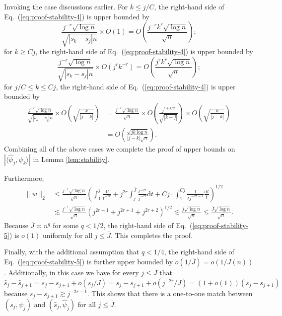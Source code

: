 \documentclass[11pt,a4paper]{article}
\renewcommand{\hat}{\widehat}
\renewcommand{\bar}{\overline}
\theoremstyle{definition}
\theoremstyle{plain}
\theoremstyle{remark}
\newcommand{\ud}{\mathrm d}
\begin{document}
Invoking the case discussions earlier. For $k\leq j/C$, the right-hand side of Eq.~(\ref{eq:proof-stability-4}) is upper bounded by
$$
 \frac{j^{-r}\sqrt{\log n}}{\sqrt{|s_k-s_j|n}}\times O(1) = O\left(\frac{j^{-r}k^r\sqrt{\log n}}{\sqrt{n}}\right);
$$
for $k\geq Cj$, the right-hand side of Eq.~(\ref{eq:proof-stability-4}) is upper bounded by 
$$
\frac{j^{-r}\sqrt{\log n}}{\sqrt{|s_k-s_j|n}}\times O(j^rk^{-r}) = O\left(\frac{j^rk^r\sqrt{\log n}}{\sqrt{n}}\right);
$$
for $j/C\leq k\leq Cj$, the right-hand side of Eq.~(\ref{eq:proof-stability-4}) is upper bounded by
\begin{align*}
\frac{j^{-r}\sqrt{\log n}}{\sqrt{|s_k-s_j|n}}\times O\left(\sqrt{\frac{k}{|j-k|}}\right) &= \frac{j^{-r}\sqrt{\log n}}{\sqrt{n}}\times O\left(\frac{j^{r+1/2}}{\sqrt{|k-j|}}\right)\times O\left(\sqrt{\frac{k}{|j-k|}}\right)\\
&= O\left(\frac{\sqrt{jk\log n}}{|j-k|\sqrt{n}}\right).
\end{align*}
Combining all of the above cases we complete the proof of upper bounds on $|\langle\hat\psi_j,\psi_k\rangle|$ in Lemma \ref{lem:stability}.

Furthermore, 
\begin{align}
\|w\|_2 &\leq \frac{j^{-r}\sqrt{\log n}}{\sqrt{n}}\left(\int_1^j \frac{\ud t}{t^{-2r}} + j^{2r}\int_j^{\bar J}\frac{t^{-2r}}{j^{-2r}}\ud t + Cj\cdot \int_1^{Cj}\frac{1}{tj^{-2r-1}}\frac{\ud t}{t}\right)^{1/2}\nonumber\\
&\lesssim \frac{j^{-r}\sqrt{\log n}}{\sqrt{n}}\left(j^{2r+1} + j^{2r+1} + j^{2r+2}\right)^{1/2} \lesssim  \frac{j\sqrt{\log n}}{\sqrt{n}}\leq \frac{\bar J\sqrt{\log n}}{\sqrt{n}}.\label{eq:proof-stability-5}
\end{align}
Because $\bar J\asymp n^q$ for some $q<1/2$, the right-hand side of Eq.~(\ref{eq:proof-stability-5}) is $o(1)$ uniformly for all $j\leq\bar J$. This completes the proof.

Finally, with the additional assumption that $q<1/4$, the right-hand side of Eq.~(\ref{eq:proof-stability-5}) is further upper bounded by $o(1/\bar J)=o(1/J(n))$. 
Additionally, in this case we have for every $j\leq \bar J$ that $\hat s_j-\hat s_{j+1} = s_j-s_{j+1}+o(s_j/\bar J)=s_j-s_{j+1}+o(j^{-2r}/\bar J) = (1+o(1))(s_j-s_{j+1})$ because $s_j-s_{j+1}\gtrsim j^{-2r-1}$.
This shows that there is a one-to-one match between $(s_j,\psi_j)$ and $(\hat s_j,\hat\psi_j)$ for all $j\leq\bar J$.



\end{document}
